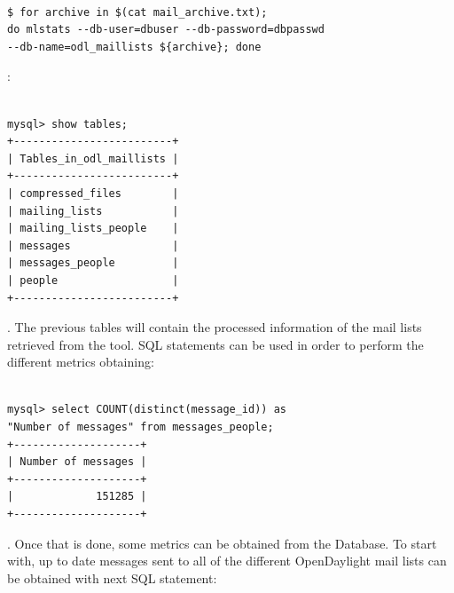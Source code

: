 \documentclass[a4paper, 12pt]{book}
\begin{document}
\begin{verbatim}

$ for archive in $(cat mail_archive.txt);
do mlstats --db-user=dbuser --db-password=dbpasswd
--db-name=odl_maillists ${archive}; done

\end{verbatim}
:

\begin{verbatim}

mysql> show tables;
+-------------------------+
| Tables_in_odl_maillists |
+-------------------------+
| compressed_files        |
| mailing_lists           |
| mailing_lists_people    |
| messages                |
| messages_people         |
| people                  |
+-------------------------+

\end{verbatim}
. The previous tables will contain the processed information of the mail lists retrieved from the tool. SQL statements can be used in order to perform the different metrics obtaining:

\begin{verbatim}

mysql> select COUNT(distinct(message_id)) as
"Number of messages" from messages_people;
+--------------------+
| Number of messages |
+--------------------+
|             151285 |
+--------------------+

\end{verbatim}
. Once that is done, some metrics can be obtained from the Database. To start with, up to date messages sent to all of the different OpenDaylight mail lists can be obtained with next SQL statement:
\end{document}
